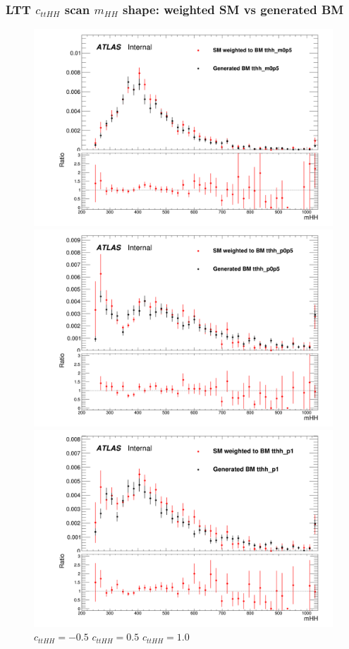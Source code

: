 \documentclass[twoside,11pt]{beamer}
\begin{document}
\begin{frame}
\frametitle{LTT $c_{ttHH}$ scan $m_{HH}$  shape: weighted SM vs generated BM}
\begin{figure}
\includegraphics[width=.32\textwidth]{figures/Method_B_all_latest_LTT/BMtthh_m0p5h_mHH.png}
\includegraphics[width=.32\textwidth]{figures/Method_B_all_latest_LTT/BMtthh_p0p5h_mHH.png}
\includegraphics[width=.32\textwidth]{figures/Method_B_all_latest_LTT/BMtthh_p1h_mHH.png}
$c_{ttHH} = -0.5$ \hspace{5em} $c_{ttHH} = 0.5$\hspace{5em} $c_{ttHH} = 1.0$    
\end{figure}

\end{frame}   
\end{document}
